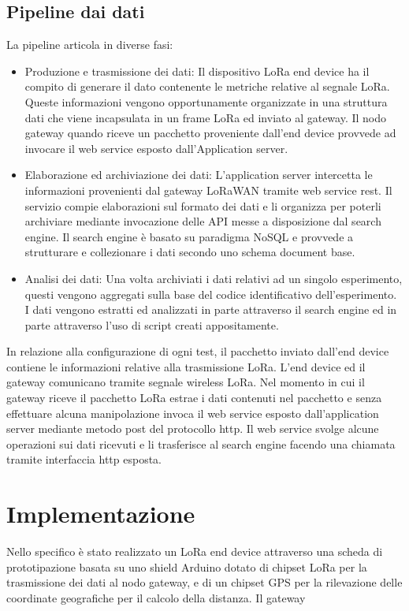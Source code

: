\documentclass[12pt,a4paper,openright,twoside]{report}
\begin{document}
\section{Pipeline dai dati}
La pipeline articola in diverse fasi: 
\begin{itemize}                       
\item Produzione e trasmissione dei dati: Il dispositivo LoRa end device ha il compito di generare il dato contenente le metriche relative al segnale LoRa. Queste informazioni vengono opportunamente organizzate in una struttura dati che viene incapsulata in un frame LoRa ed inviato al gateway. Il nodo gateway quando riceve un pacchetto proveniente dall'end device provvede ad invocare il web service esposto dall'Application server.
\item Elaborazione ed archiviazione dei dati: L'application server intercetta le informazioni provenienti dal gateway LoRaWAN tramite web service rest. Il servizio compie elaborazioni sul formato dei dati e li organizza per poterli archiviare mediante invocazione delle API messe a disposizione dal search engine. Il search engine è basato su paradigma NoSQL e provvede a strutturare e collezionare i dati secondo uno schema document base.
\item Analisi dei dati: Una volta archiviati i dati relativi ad un singolo esperimento, questi vengono aggregati sulla base del codice identificativo dell'esperimento. I dati vengono estratti ed analizzati in parte attraverso il search engine ed in parte attraverso l'uso di script creati appositamente.   
\end{itemize}
In relazione alla configurazione di ogni test, il pacchetto inviato dall'end device contiene le informazioni relative alla trasmissione LoRa.
L'end device ed il gateway comunicano tramite segnale wireless LoRa. Nel momento in cui il gateway riceve il pacchetto LoRa estrae i dati contenuti nel pacchetto e senza effettuare alcuna manipolazione invoca il web service esposto dall'application server mediante metodo post del protocollo http. Il web service svolge alcune operazioni sui dati ricevuti e li trasferisce al search engine facendo una chiamata tramite interfaccia http esposta.  


\chapter{Implementazione}
Nello specifico \`e stato realizzato un LoRa end device attraverso una scheda di prototipazione basata su uno shield Arduino dotato di chipset LoRa per la trasmissione dei dati al nodo gateway, e di un chipset GPS per la rilevazione delle coordinate geografiche per il calcolo della distanza. Il gateway   
\end{document}
